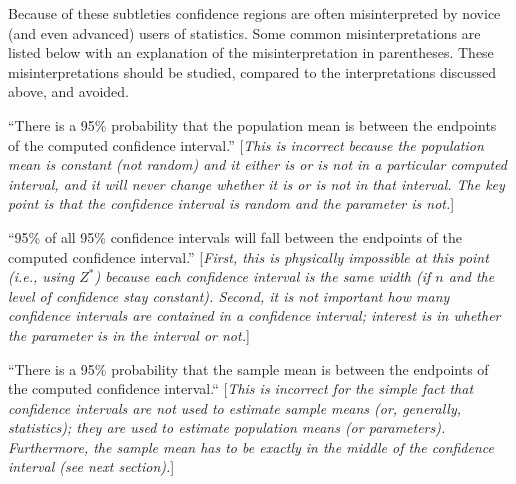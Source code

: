 \documentclass[10pt,openany]{book}\usepackage[]{graphicx}\usepackage[]{color}
\begin{document}
Because of these subtleties confidence regions are often misinterpreted by novice (and even advanced) users of statistics.  Some common misinterpretations are listed below with an explanation of the misinterpretation in parentheses.  These misinterpretations should be studied, compared to the interpretations discussed above, and avoided.
\begin{Enumerate}
  \item ``There is a 95\% probability that the population mean is between the endpoints of the computed confidence interval.'' [\textit{This is incorrect because the population mean is constant (not random) and it either is or is not in a particular computed interval, and it will never change whether it is or is not in that interval.  The key point is that the confidence interval is random and the parameter is not.}]
  \item ``95\% of all 95\% confidence intervals will fall between the endpoints of the computed confidence interval.'' [\textit{First, this is physically impossible at this point (i.e., using $Z^{*}$) because each confidence interval is the same width (if $n$ and the level of confidence stay constant).  Second, it is not important how many confidence intervals are contained in a confidence interval; interest is in whether the parameter is in the interval or not.}]
  \item ``There is a 95\% probability that the sample mean is between the endpoints of the computed confidence interval.`` [\textit{This is incorrect for the simple fact that confidence intervals are not used to estimate sample means (or, generally, statistics); they are used to estimate population means (or parameters).  Furthermore, the sample mean has to be exactly in the middle of the confidence interval (see next section).}]
\end{Enumerate}

\vspace{-12pt}

\vspace{-12pt}
\end{document}
